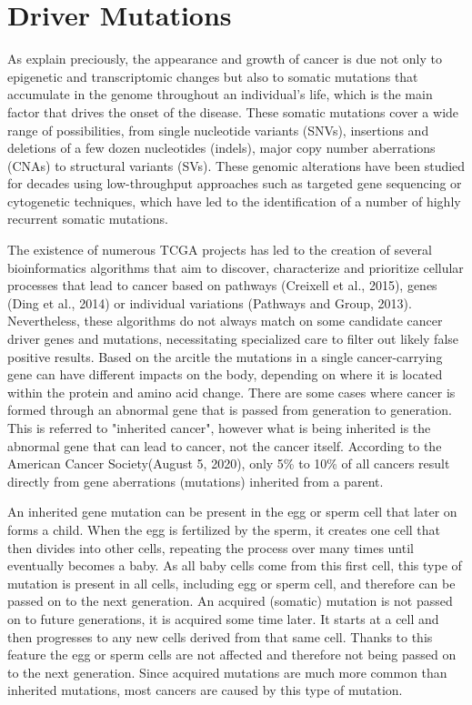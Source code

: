 \section{Driver Mutations} %
\label{sec:driver_mutation}
\hspace{10px}As explain preciously, the appearance and growth of cancer is due not only to epigenetic and transcriptomic changes but also to somatic mutations that accumulate in the genome throughout an individual's life, which is the main factor that drives the onset of the disease. These somatic mutations cover a wide range of possibilities, from single nucleotide variants (SNVs), insertions and deletions of a few dozen nucleotides (indels), major copy number aberrations (CNAs) to structural variants (SVs). These genomic alterations have been studied for decades using low-throughput approaches such as targeted gene sequencing or cytogenetic techniques, which have led to the identification of a number of highly recurrent somatic mutations\cite{Bailey}.

The existence of numerous TCGA projects has led to the creation of several bioinformatics algorithms that aim to discover, characterize and prioritize cellular processes that lead to cancer based on pathways (Creixell et al., 2015), genes (Ding et al., 2014) or individual variations (Pathways and Group, 2013). Nevertheless, these algorithms do not always match on some candidate cancer driver genes and mutations, necessitating specialized care to filter out likely false positive results. Based on the arcitle \cite{Carter} the mutations in a single cancer-carrying gene can have different impacts on the body, depending on where it is located within the protein and amino acid change. There are some cases where cancer is formed through an abnormal gene that is passed from generation to generation. This is referred to "inherited cancer", however what is being inherited is the abnormal gene that can lead to cancer, not the cancer itself. According to the American Cancer Society(August 5, 2020), only  5\% to 10\% of all cancers result directly from gene aberrations (mutations) inherited from a parent.

An inherited gene mutation can be present in the egg or sperm cell that later on forms a child. When the egg is fertilized by the sperm, it creates one cell that then divides into other cells, repeating the process over many times until eventually becomes a baby. As all baby cells come from this first cell, this type of mutation is present in all cells, including egg or sperm cell, and therefore can be passed on to the next generation. An acquired (somatic) mutation is not passed on to future generations, it is acquired some time later. It starts at a cell and then progresses to any new cells derived from that same cell. Thanks to this feature the egg or sperm cells are not affected and therefore not being passed on to the next generation. Since acquired mutations are much more common than inherited mutations, most cancers are caused by this type of mutation.

